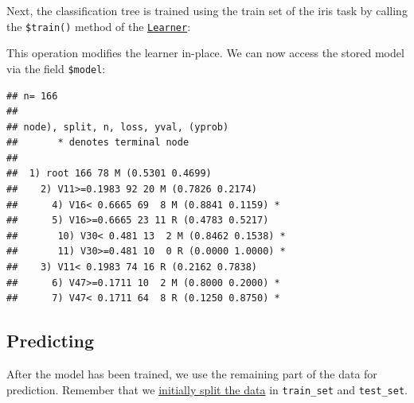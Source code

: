 \documentclass[]{scrbook}
\newenvironment{Shaded}{\begin{snugshade}}{\end{snugshade}}
\newcommand{\DataTypeTok}[1]{\textcolor[rgb]{0.13,0.29,0.53}{#1}}
\newcommand{\KeywordTok}[1]{\textcolor[rgb]{0.13,0.29,0.53}{\textbf{#1}}}
\newcommand{\NormalTok}[1]{#1}
\newcommand{\OperatorTok}[1]{\textcolor[rgb]{0.81,0.36,0.00}{\textbf{#1}}}
\newcommand{\StringTok}[1]{\textcolor[rgb]{0.31,0.60,0.02}{#1}}
\renewenvironment{Shaded} {\begin{snugshade}\small} {\end{snugshade}}
\begin{document}
Next, the classification tree is trained using the train set of the iris task by calling the \texttt{\$train()} method of the \href{https://mlr3.mlr-org.com/reference/Learner.html}{\texttt{Learner}}:

\begin{Shaded}
\end{Shaded}

This operation modifies the learner in-place.
We can now access the stored model via the field \texttt{\$model}:

\begin{Shaded}
\end{Shaded}

\begin{verbatim}
## n= 166 
## 
## node), split, n, loss, yval, (yprob)
##       * denotes terminal node
## 
##  1) root 166 78 M (0.5301 0.4699)  
##    2) V11>=0.1983 92 20 M (0.7826 0.2174)  
##      4) V16< 0.6665 69  8 M (0.8841 0.1159) *
##      5) V16>=0.6665 23 11 R (0.4783 0.5217)  
##       10) V30< 0.481 13  2 M (0.8462 0.1538) *
##       11) V30>=0.481 10  0 R (0.0000 1.0000) *
##    3) V11< 0.1983 74 16 R (0.2162 0.7838)  
##      6) V47>=0.1711 10  2 M (0.8000 0.2000) *
##      7) V47< 0.1711 64  8 R (0.1250 0.8750) *
\end{verbatim}

\hypertarget{predicting}{%
\subsection{Predicting}\label{predicting}}

After the model has been trained, we use the remaining part of the data for prediction.
Remember that we \protect\hyperlink{split-data}{initially split the data} in \texttt{train\_set} and \texttt{test\_set}.

\begin{Shaded}
\end{Shaded}
\end{document}
